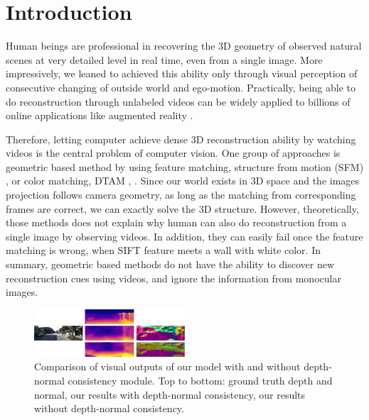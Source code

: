 \section{Introduction}
\label{sec:intro}
Human beings are professional in recovering the 3D geometry of observed natural scenes at very detailed level in real time, even from a single image. 
More impressively, we leaned to achieved this ability only through visual perception of consecutive changing of outside world and ego-motion. 
Practically, being able to do reconstruction through unlabeled videos can be widely applied to billions of online  applications like augmented reality \etc.

Therefore, letting computer achieve dense 3D reconstruction ability by watching videos is the central problem of computer vision. 
One group of approaches is geometric based method by using feature matching, \eg structure from motion (SFM) \cite{wu2011visualsfm} \etc, or color matching, \eg DTAM \cite{NewcombeLD11}, \etc.  Since our world exists in 3D space and the images projection follows camera geometry, as long as the matching from corresponding frames are correct, we can exactly solve the 3D structure. 
However, theoretically, those methods does not explain why human can also do reconstruction from a single image by observing videos. In addition, they can easily fail once the feature matching is wrong, \eg when SIFT \cite{lowe2004distinctive}  feature meets a wall with white color. 
In summary, geometric based methods do not have the ability to discover new reconstruction cues using videos, and ignore the information from monocular images.

\begin{figure}
\centering
\includegraphics[width=0.5\textwidth, height=0.25\textwidth]{figures/visual_comparison.pdf}
\caption{Comparison of visual outputs of our model with and without depth-normal consistency module. Top to bottom: ground truth depth and normal, our results with depth-normal consistency, our results without depth-normal consistency.}
\label{fig:visual_comparison}
\end{figure}

